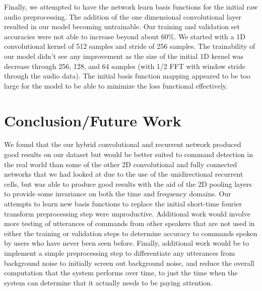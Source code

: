\documentclass{article}
\begin{document}
Finally, we attempted to have the network learn basis functions for
the initial raw audio preprocessing. The addition of the one
dimensional convolutional layer resulted in our model becoming
untrainable. Our training and validation set accuracies were not able
to increase beyond about 60\%. We started with a 1D convolutional
kernel of 512 samples and stride of 256 samples. The trainability of
our model didn't see any improvement as the size of the initial 1D
kernel was decrease through 256, 128, and 64 samples (with 1/2 FFT
with window stride through the audio data). The initial basis function
mapping appeared to be too large for the model to be able to minimize
the loss functional effectively.

\section{Conclusion/Future Work }
We found that the our hybrid convolutional and recurrent network
produced good results on our dataset but would be better suited to
command detection in the real world than some of the other 2D
convolutional and fully connected networks that we had looked at due
to the use of the unidirectional recurrent cells, but was able to
produce good results with the aid of the 2D pooling layers to provide
some invariance on both the time and frequency domains. Our attempts
to learn new basis functions to replace the initial short-time fourier
transform preprocessing step were unproductive. Additional work would
involve more testing of utterances of commands from other speakers
that are not used in either the training or validation steps to
determine accuracy to commands spoken by users who have never been
seen before. Finally, additional work would be to implement a simple
preprocessing step to differentiate any utterances from background
noise to initially screen out background noise, and reduce the overall
computation that the system performs over time, to just the time when
the system can determine that it actually needs to be paying attention.
\end{document}

